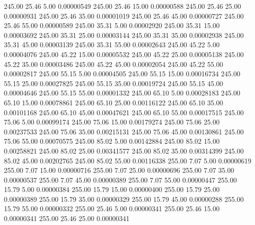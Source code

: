     245.00     25.46      5.00     0.00000549
    245.00     25.46     15.00     0.00000588
    245.00     25.46     25.00     0.00000931
    245.00     25.46     35.00     0.00001019
    245.00     25.46     45.00     0.00000727
    245.00     25.46     55.00     0.00000589
    245.00     35.31      5.00     0.00002920
    245.00     35.31     15.00     0.00003692
    245.00     35.31     25.00     0.00003144
    245.00     35.31     35.00     0.00002938
    245.00     35.31     45.00     0.00003139
    245.00     35.31     55.00     0.00002643
    245.00     45.22      5.00     0.00004076
    245.00     45.22     15.00     0.00005532
    245.00     45.22     25.00     0.00005138
    245.00     45.22     35.00     0.00003486
    245.00     45.22     45.00     0.00002054
    245.00     45.22     55.00     0.00002817
    245.00     55.15      5.00     0.00004505
    245.00     55.15     15.00     0.00016734
    245.00     55.15     25.00     0.00027825
    245.00     55.15     35.00     0.00019724
    245.00     55.15     45.00     0.00004646
    245.00     55.15     55.00     0.00001332
    245.00     65.10      5.00     0.00028183
    245.00     65.10     15.00     0.00078861
    245.00     65.10     25.00     0.00116122
    245.00     65.10     35.00     0.00101168
    245.00     65.10     45.00     0.00047621
    245.00     65.10     55.00     0.00017515
    245.00     75.06      5.00     0.00099174
    245.00     75.06     15.00     0.00179274
    245.00     75.06     25.00     0.00237533
    245.00     75.06     35.00     0.00215131
    245.00     75.06     45.00     0.00130861
    245.00     75.06     55.00     0.00070575
    245.00     85.02      5.00     0.00142884
    245.00     85.02     15.00     0.00258821
    245.00     85.02     25.00     0.00341577
    245.00     85.02     35.00     0.00314399
    245.00     85.02     45.00     0.00202765
    245.00     85.02     55.00     0.00116338
    255.00      7.07      5.00     0.00000619
    255.00      7.07     15.00     0.00000716
    255.00      7.07     25.00     0.00000696
    255.00      7.07     35.00     0.00000537
    255.00      7.07     45.00     0.00000389
    255.00      7.07     55.00     0.00000447
    255.00     15.79      5.00     0.00000384
    255.00     15.79     15.00     0.00000400
    255.00     15.79     25.00     0.00000389
    255.00     15.79     35.00     0.00000329
    255.00     15.79     45.00     0.00000288
    255.00     15.79     55.00     0.00000332
    255.00     25.46      5.00     0.00000341
    255.00     25.46     15.00     0.00000341
    255.00     25.46     25.00     0.00000341
